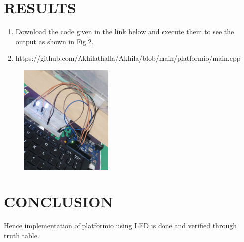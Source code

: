 \documentclass[conference]{IEEEtran}
\begin{document}
 \section{RESULTS}
 \begin{enumerate}
	 \item Download the code given in the link below and execute them to see the output as shown in Fig.2. 
	 \item https://github.com/Akhilathalla/Akhila/blob/main/platformio/main.cpp                                           
 \end{enumerate}


\begin{figure}[h]                           
\centering                                 
\includegraphics[width=0.4\textwidth]{2.jpg}                                           
\caption{\label{fig-5:Gates}}               
\end{figure}

\section{CONCLUSION}
 Hence implementation of platformio using LED is done and verified through truth table.

 
\end{document}
